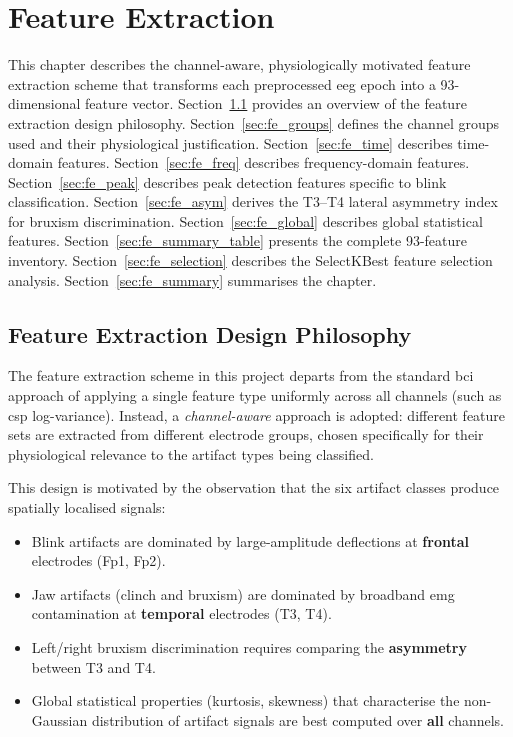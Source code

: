 \chapter{Feature Extraction}
\label{ch:feature_extraction}

This chapter describes the channel-aware, physiologically
motivated feature extraction scheme that transforms each
preprocessed \acrshort{eeg} epoch into a 93-dimensional
feature vector. Section~\ref{sec:fe_overview} provides an
overview of the feature extraction design philosophy.
Section~\ref{sec:fe_groups} defines the channel groups used
and their physiological justification. Section~\ref{sec:fe_time}
describes time-domain features. Section~\ref{sec:fe_freq}
describes frequency-domain features. Section~\ref{sec:fe_peak}
describes peak detection features specific to blink
classification. Section~\ref{sec:fe_asym} derives the T3--T4
lateral asymmetry index for bruxism discrimination.
Section~\ref{sec:fe_global} describes global statistical
features. Section~\ref{sec:fe_summary_table} presents the
complete 93-feature inventory. Section~\ref{sec:fe_selection}
describes the SelectKBest feature selection analysis.
Section~\ref{sec:fe_summary} summarises the chapter.

\section{Feature Extraction Design Philosophy}
\label{sec:fe_overview}

The feature extraction scheme in this project departs from the
standard \acrshort{bci} approach of applying a single feature
type uniformly across all channels (such as \acrshort{csp}
log-variance). Instead, a \textit{channel-aware} approach is
adopted: different feature sets are extracted from different
electrode groups, chosen specifically for their physiological
relevance to the artifact types being classified.

This design is motivated by the observation that the six
artifact classes produce spatially localised signals:

\begin{itemize}[leftmargin=*]
    \item Blink artifacts are dominated by large-amplitude
    deflections at \textbf{frontal} electrodes (Fp1, Fp2).
    \item Jaw artifacts (clinch and bruxism) are dominated by
    broadband \acrshort{emg} contamination at \textbf{temporal}
    electrodes (T3, T4).
    \item Left/right bruxism discrimination requires comparing
    the \textbf{asymmetry} between T3 and T4.
    \item Global statistical properties (kurtosis, skewness)
    that characterise the non-Gaussian distribution of artifact
    signals are best computed over \textbf{all} channels.
\end{itemize}

